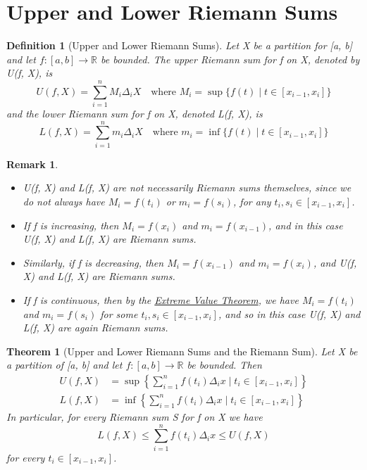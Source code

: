 \documentclass[11pt, oneside]{book}
\theoremstyle{break}
\newtheorem{thm}{Theorem}[section]
\newtheorem*{remark}{Remark}
\newtheorem{defn}{Definition}[section]
\newcommand{\bb}[1]{\mathbb{#1}}			%
\begin{document}
\section{Upper and Lower Riemann Sums}

\begin{defn}[Upper and Lower Riemann Sums]
	Let X be a partition for [a, b] and let $f: [a, b] \to \bb{R}$ be bounded. The upper Riemann sum for f on X, denoted by U(f, X), is
	\[
		U(f, X) = \sum_{i=1}^{n} M_i \Delta_i X \quad \text{where } M_i = \sup \{f(t) \; | \; t \in [x_{i-1}, x_i] \}
	\]
	and the lower Riemann sum for f on X, denoted L(f, X), is
	\[
		L(f, X) = \sum_{i = 1}^{n} m_i \Delta_i X \quad \text{where } m_i = \inf \{f(t) \; | \; t \in [x_{i-1}, x_i]\}
	\]
\end{defn}

\begin{remark}
	\begin{itemize}
		\item U(f, X) and L(f, X) are not necessarily Riemann sums themselves, since we do not always have $M_i = f(t_i)$ or $m_i = f(s_i)$, for any $t_i, s_i \in [x_{i-1}, x_i]$.
		\item If f is increasing, then $M_i = f(x_i)$ and $m_i = f(x_{i-1})$, and in this case U(f, X) and L(f, X) are Riemann sums.
		\item Similarly, if f is decreasing, then $M_i = f(x_{i-1})$ and $m_i = f(x_i)$, and U(f, X) and L(f, X) are Riemann sums.
		\item If f is continuous, then by the \hyperref[EVT]{Extreme Value Theorem}, we have $M_i = f(t_i)$ and $m_i = f(s_i)$ for some $t_i, s_i \in [x_{i-1}, x_i]$, and so in this case U(f, X) and L(f, X) are again Riemann sums.
	\end{itemize}
\end{remark}

\begin{thm}[Upper and Lower Riemann Sums and the Riemann Sum]
	Let X be a partition of [a, b] and let $f: [a, b] \to \bb{R}$ be bounded. Then
	\begin{align*}
		U(f, X) &= \sup \left\{\sum_{i=1}^{n} f(t_i) \Delta_i x \; \Bigg| \; t_i \in [x_{i-1}, x_i] \right\} \\
		L(f, X) &= \inf \left\{\sum_{i=1}^{n} f(t_i) \Delta_i x \; \Bigg| \; t_i \in [x_{i-1}, x_i] \right\}
	\end{align*}
	In particular, for every Riemann sum S for f on X we have
	\[
		L(f, X) \leq \sum_{i=1}^{n} f(t_i) \Delta_i x \leq U(f, X)
	\]
	for every $t_i \in [x_{i-1}, x_i]$.
\end{thm}
\end{document}
